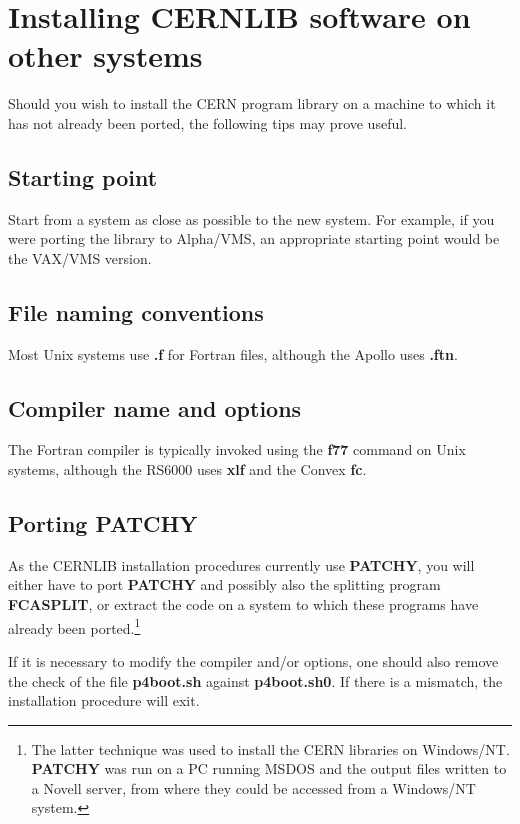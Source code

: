 \chapter{Installing CERNLIB software on other systems}

Should you wish to install the CERN program library on a machine
to which it has not already been ported, the following tips may
prove useful.

\section{Starting point}

Start from a system as close as possible to the new system.
For example, if you were porting the library to Alpha/VMS,
an appropriate starting point would be the VAX/VMS version.

\section{File naming conventions}

Most Unix systems use {\bf .f} for Fortran files, although the Apollo uses {\bf .ftn}.

\section{Compiler name and options}

The Fortran compiler is typically invoked using the {\bf f77} command on Unix
systems, although the RS6000 uses {\bf xlf} and the Convex {\bf fc}.

\section{Porting {\bf PATCHY}}

As the CERNLIB installation procedures currently use {\bf PATCHY}, you
will either have to port {\bf PATCHY} and possibly also the
splitting program {\bf FCASPLIT}, or extract the code on
a system to which these programs have already been ported.\footnote{The
latter technique was used to install the CERN libraries on Windows/NT.
{\bf PATCHY} was run on a PC running MSDOS and the output files
written to a Novell server, from where they could be accessed
from a Windows/NT system.}

If it is necessary to modify the compiler and/or options, one
should also remove the check of the file {\bf p4boot.sh} against
{\bf p4boot.sh0}. If there is a mismatch, the installation procedure
will exit.


